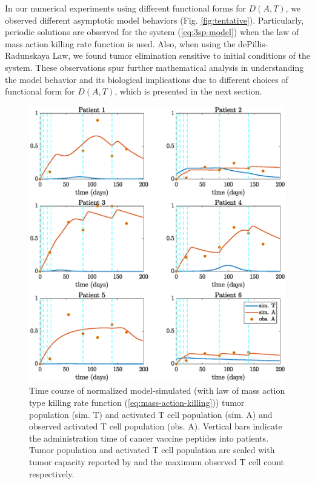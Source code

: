 \documentclass[review,authoryear]{elsarticle}
\begin{document}
In our numerical experiments using different functional forms for $D(A,T)$, we observed different asymptotic model behaviors (Fig. \ref{fig:tentative}). Particularly, periodic solutions are observed for the system (\ref{eq:3sp-model}) when the law of mass action killing rate function is used. Also, when using the dePillis-Radunskaya Law, we found tumor elimination sensitive to initial conditions of the system. These observations spur further mathematical analysis in understanding the model behavior and its biological implications due to different choices of functional form for $D(A,T)$, which is presented in the next section. 

\begin{figure}[!h]
\centerline{\includegraphics[width=0.7\paperwidth]{figs/pat1-6fitting}}\caption{Time course of normalized model-simulated (with law of mass action type killing rate function (\ref{eq:mass-action-killing})) tumor population (sim. T) and activated T cell population (sim. A) and observed activated T cell population (obs. A). Vertical bars indicate the administration time of cancer vaccine peptides into patients. Tumor population and activated T cell population are scaled with tumor capacity reported by \citet{Messan2021} and the maximum observed T cell count respectively.  \label{fig:data-fitting.}}
\end{figure}
\end{document}
